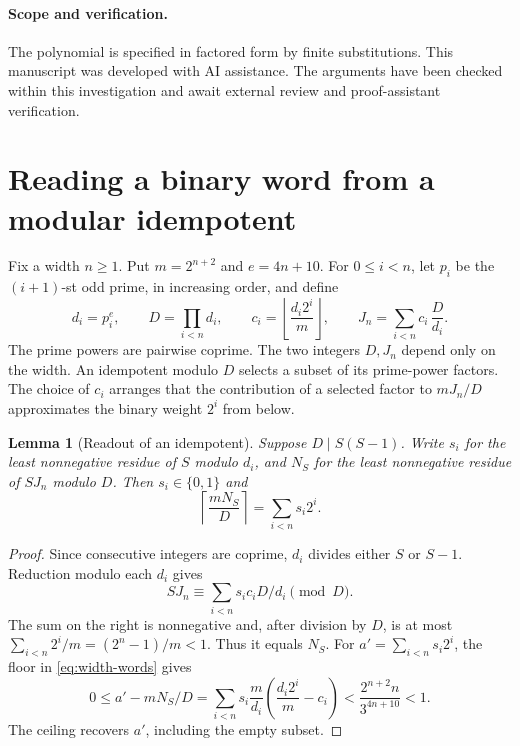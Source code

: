 \documentclass[11pt,letterpaper]{article}
\newtheorem{lemma}[theorem]{Lemma}
\numberwithin{equation}{section}
\begin{document}
\paragraph{Scope and verification.}
The polynomial is specified in factored form by finite substitutions. This manuscript was developed with AI assistance. The arguments have been checked within this investigation and await external review and proof-assistant verification.

\tableofcontents
\clearpage

\section{Reading a binary word from a modular idempotent}\label{sec:residues}

Fix a width \(n\ge1\). Put \(m=2^{n+2}\) and \(e=4n+10\). For
\(0\le i<n\), let \(p_i\) be the \((i+1)\)-st odd prime, in increasing
order, and define
\begin{equation}\label{eq:width-words}
 d_i=p_i^e,\qquad D=\prod_{i<n}d_i,\qquad
 c_i=\left\lfloor\frac{d_i2^i}{m}\right\rfloor,\qquad
 J_n=\sum_{i<n} c_i\,\frac{D}{d_i}.
\end{equation}
The prime powers are pairwise coprime. The two integers \(D,J_n\) depend
only on the width. An idempotent modulo \(D\) selects a subset of its
prime-power factors. The choice of \(c_i\) arranges that the contribution
of a selected factor to \(mJ_n/D\) approximates the binary weight \(2^i\)
from below.

\begin{lemma}[Readout of an idempotent]\label{lem:read}
Suppose \(D\mid S(S-1)\). Write \(s_i\) for the least nonnegative
residue of \(S\) modulo \(d_i\), and \(N_S\) for the least nonnegative
residue of \(SJ_n\) modulo \(D\). Then \(s_i\in\{0,1\}\) and
\[
                    \left\lceil\frac{mN_S}{D}\right\rceil
                       =\sum_{i<n}s_i2^i .
\]
\end{lemma}
\begin{proof}
Since consecutive integers are coprime, \(d_i\) divides either \(S\) or
\(S-1\). Reduction modulo each \(d_i\) gives
\[
 SJ_n\equiv\sum_{i<n}s_ic_iD/d_i\pmod D.
\]
The sum on the right is nonnegative and, after division by \(D\), is at
most \(\sum_{i<n}2^i/m=(2^n-1)/m<1\). Thus it equals \(N_S\). For
\(a'=\sum_{i<n}s_i2^i\), the floor in \eqref{eq:width-words} gives
\[
 0\le a'-mN_S/D
   =\sum_{i<n}s_i\frac{m}{d_i}
             \left(\frac{d_i2^i}{m}-c_i\right)
   <\frac{2^{n+2}n}{3^{4n+10}}<1 .
\]
The ceiling recovers \(a'\), including the empty subset.
\end{proof}
\end{document}
